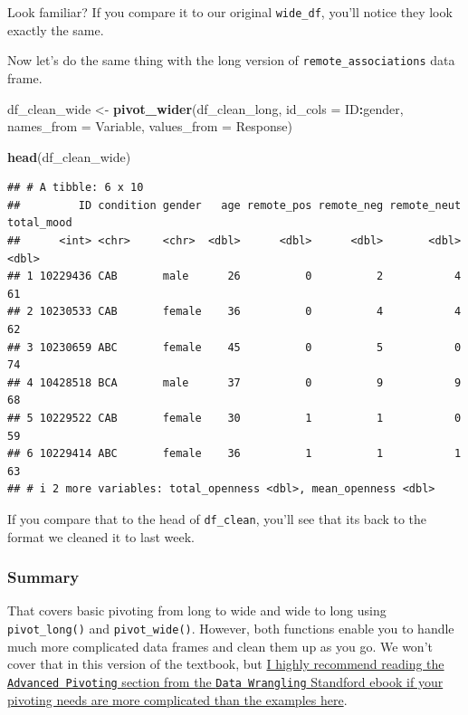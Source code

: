 \documentclass[
]{book}
\newenvironment{Shaded}{\begin{snugshade}}{\end{snugshade}}
\newcommand{\AttributeTok}[1]{\textcolor[rgb]{0.13,0.29,0.53}{#1}}
\newcommand{\FunctionTok}[1]{\textcolor[rgb]{0.13,0.29,0.53}{\textbf{#1}}}
\newcommand{\NormalTok}[1]{#1}
\newcommand{\OtherTok}[1]{\textcolor[rgb]{0.56,0.35,0.01}{#1}}
\newcommand{\SpecialCharTok}[1]{\textcolor[rgb]{0.81,0.36,0.00}{\textbf{#1}}}
\begin{document}
Look familiar? If you compare it to our original \texttt{wide\_df}, you'll notice they look exactly the same.

Now let's do the same thing with the long version of \texttt{remote\_associations} data frame.

\begin{Shaded}
\begin{Highlighting}[]
\NormalTok{df\_clean\_wide }\OtherTok{\textless{}{-}} \FunctionTok{pivot\_wider}\NormalTok{(df\_clean\_long,}
                             \AttributeTok{id\_cols =}\NormalTok{ ID}\SpecialCharTok{:}\NormalTok{gender,}
                             \AttributeTok{names\_from =}\NormalTok{ Variable,}
                             \AttributeTok{values\_from =}\NormalTok{ Response)}

\FunctionTok{head}\NormalTok{(df\_clean\_wide)}
\end{Highlighting}
\end{Shaded}

\begin{verbatim}
## # A tibble: 6 x 10
##         ID condition gender   age remote_pos remote_neg remote_neut total_mood
##      <int> <chr>     <chr>  <dbl>      <dbl>      <dbl>       <dbl>      <dbl>
## 1 10229436 CAB       male      26          0          2           4         61
## 2 10230533 CAB       female    36          0          4           4         62
## 3 10230659 ABC       female    45          0          5           0         74
## 4 10428518 BCA       male      37          0          9           9         68
## 5 10229522 CAB       female    30          1          1           0         59
## 6 10229414 ABC       female    36          1          1           1         63
## # i 2 more variables: total_openness <dbl>, mean_openness <dbl>
\end{verbatim}

If you compare that to the head of \texttt{df\_clean}, you'll see that its back to the format we cleaned it to last week.

\subsubsection{Summary}\label{summary-6}

That covers basic pivoting from long to wide and wide to long using \texttt{pivot\_long()} and \texttt{pivot\_wide()}. However, both functions enable you to handle much more complicated data frames and clean them up as you go. We won't cover that in this version of the textbook, but \href{https://dcl-wrangle.stanford.edu/pivot-advanced.html}{I highly recommend reading the \texttt{Advanced\ Pivoting} section from the \texttt{Data\ Wrangling} Standford ebook if your pivoting needs are more complicated than the examples here}.
\end{document}
